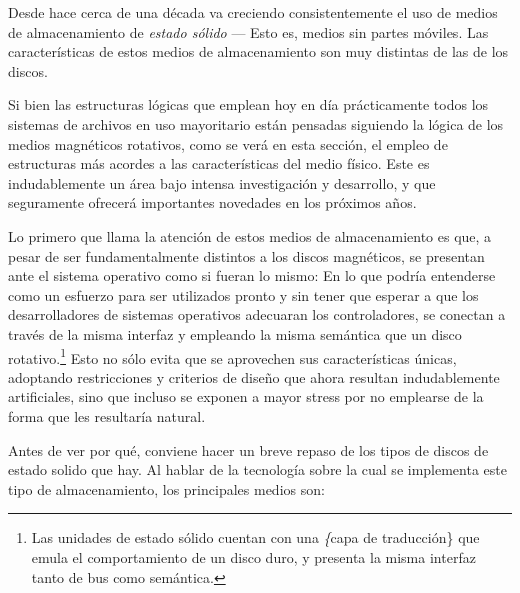 \documentclass[11pt,fleqn]{book} %
\begin{document}
Desde hace cerca de una década va creciendo consistentemente el uso de
medios de almacenamiento de \emph{estado sólido} — Esto es, medios sin
partes móviles. Las características de estos medios de almacenamiento
son muy distintas de las de los discos.

Si bien las estructuras lógicas que emplean hoy en día prácticamente
todos los sistemas de archivos en uso mayoritario están pensadas
siguiendo la lógica de los medios magnéticos rotativos, como se verá
en esta sección, el empleo de estructuras más acordes a las
características del medio físico. Este es indudablemente un área bajo
intensa investigación y desarrollo, y que seguramente ofrecerá
importantes novedades en los próximos años.

Lo primero que llama la atención de estos medios de almacenamiento es
que, a pesar de ser fundamentalmente distintos a los discos
magnéticos, se presentan ante el sistema operativo como si fueran lo
mismo: En lo que podría entenderse como un esfuerzo para ser
utilizados pronto y sin tener que esperar a que los desarrolladores de
sistemas operativos adecuaran los controladores, se conectan a través
de la misma interfaz y empleando la misma semántica que un disco
rotativo.\footnote{Las unidades de estado sólido cuentan con una \emph\{capa de
traducción\} que emula el comportamiento de un disco duro, y presenta
la misma interfaz tanto de bus como semántica. } Esto no sólo evita que
se aprovechen sus características únicas, adoptando restricciones y
criterios de diseño que ahora resultan indudablemente artificiales,
sino que incluso se exponen a mayor stress por no emplearse de la
forma que les resultaría natural.

Antes de ver por qué, conviene hacer un breve repaso de los tipos de
discos de estado solido que hay.  Al hablar de la tecnología sobre la
cual se implementa este tipo de almacenamiento, los principales medios
son:
\end{document}
